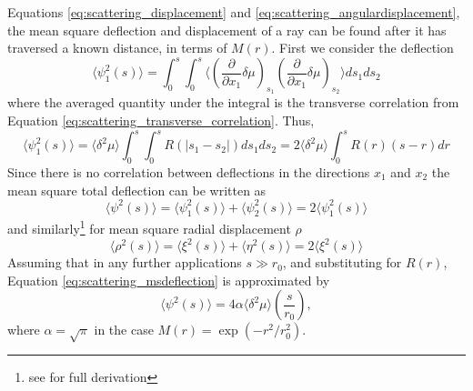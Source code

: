 Equations \ref{eq:scattering_displacement} and \ref{eq:scattering_angulardisplacement}, the mean square deflection and displacement of a ray can be found after it has traversed a known distance, in terms of $M(r)$. First we consider the deflection
\begin{equation}
\langle \psi_1^2(s) \rangle = \int_0^s \int_0^s \bigg \langle \left( \frac{\partial}{\partial x_1} \delta \mu \right)_{s_1} \left( \frac{\partial}{\partial {x_1} } \delta \mu \right)_{s_2} \bigg \rangle ds_1 ds_2
\end{equation}
where the averaged quantity under the integral is the transverse correlation from Equation \ref{eq:scattering_transverse_correlation}.
Thus,
\begin{equation}
\label{eq:scattering_msdeflection}
\langle \psi_1^2(s) \rangle  = \langle \delta^2 \mu \rangle \int_0^s \int_0^s R(\vert s_1 - s_2 \vert) ds_1 ds_2 = 2 \langle \delta^2 \mu \rangle \int_0^s R(r) (s - r) dr
\end{equation}
Since there is no correlation between deflections in the directions $x_1$ and $x_2$ the mean square total deflection can be written as
\begin{equation}
\label{eq:scattering_mstotaldeflection}
\langle \psi^2(s) \rangle = \langle \psi_1^2(s) \rangle + \langle \psi_2^2(s) \rangle = 2 \langle \psi_1^2(s) \rangle
\end{equation}
and similarly\footnote{see \cite{Chandrasekhar1952} for full derivation} for mean square radial displacement $\rho$
\begin{equation}
\label{eq:scattering_mstotaldisplacement}
\langle \rho^2(s) \rangle = \langle \xi^2(s) \rangle + \langle \eta^2(s) \rangle = 2 \langle \xi^2(s) \rangle
\end{equation}
Assuming that in any further applications $s \gg r_0$, and substituting for $R(r)$, Equation \ref{eq:scattering_msdeflection} is approximated by
\begin{equation}
\label{eq:scattering}
\langle \psi^2(s) \rangle = 4 \alpha  \langle \delta^2 \mu \rangle \left( \frac{s}{r_0} \right),
\end{equation}
where $\alpha = \sqrt{\pi}$ in the case $M(r) = \exp{(-r^2/r_0^2)}$.

